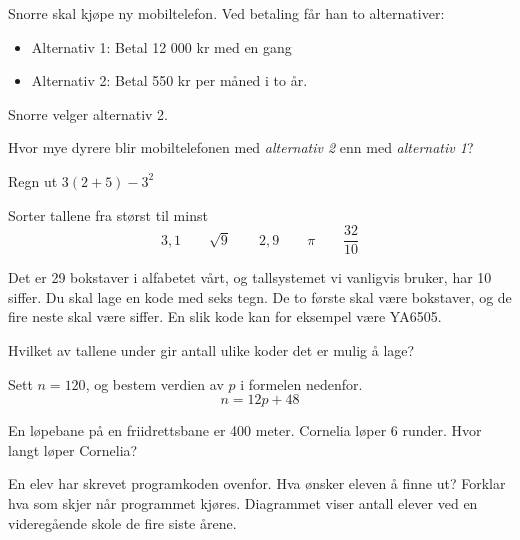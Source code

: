 Snorre skal kjøpe ny mobiltelefon.
Ved betaling får han to alternativer:
\begin{itemize}
	\item Alternativ 1: Betal 12 000 kr med en gang
	\item Alternativ 2: Betal 550 kr per måned i to år.
\end{itemize}
Snorre velger alternativ 2. \os

Hvor mye dyrere blir mobiltelefonen med \textsl{alternativ 2} enn med \textsl{alternativ 1}?

Regn ut $ 3(2+5)-3^2  $

Sorter tallene fra størst til minst
\[ 3,1\qquad\sqrt{9}\qquad2,9\qquad\pi \qquad \frac{32}{10} \]

\newpage
{}
Det er 29 bokstaver i alfabetet vårt, og tallsystemet vi vanligvis bruker, har 10 siffer.
Du skal lage en kode med seks tegn. De to første skal være bokstaver, og de fire neste skal være
siffer. En slik kode kan for eksempel være YA6505. \os

Hvilket av tallene under gir antall ulike koder det er mulig å lage? \os
{}

Sett $ n=120 $, og bestem verdien av $ p $ i formelen nedenfor. 
\[ n = 12p + 48 \]

En løpebane på en friidrettsbane er 400 meter.
Cornelia løper 6 runder. Hvor langt løper Cornelia? \os


En elev har skrevet programkoden ovenfor.
Hva ønsker eleven å finne ut?
Forklar hva som skjer når programmet kjøres.
\newpage
{}
Diagrammet viser antall elever ved en videregående skole de fire siste årene.\os

